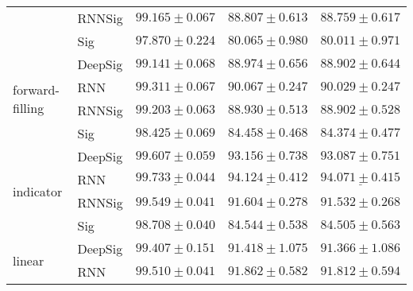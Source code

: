 \begin{tabular}{lllll}
                                 & RNNSig  &                           $ 99.165 \pm 0.067 $ &                           $ 88.807 \pm 0.613 $ &                           $ 88.759 \pm 0.617 $ \\
                                 & Sig     &                           $ 97.870 \pm 0.224 $ &                           $ 80.065 \pm 0.980 $ &                           $ 80.011 \pm 0.971 $ \\
\midrule
\multirow{4}{*}{forward-filling} & DeepSig &                           $ 99.141 \pm 0.068 $ &                           $ 88.974 \pm 0.656 $ &                           $ 88.902 \pm 0.644 $ \\
                                 & RNN     &                           $ 99.311 \pm 0.067 $ &                           $ 90.067 \pm 0.247 $ &                           $ 90.029 \pm 0.247 $ \\
                                 & RNNSig  &                           $ 99.203 \pm 0.063 $ &                           $ 88.930 \pm 0.513 $ &                           $ 88.902 \pm 0.528 $ \\
                                 & Sig     &                           $ 98.425 \pm 0.069 $ &                           $ 84.458 \pm 0.468 $ &                           $ 84.374 \pm 0.477 $ \\
\midrule
\multirow{4}{*}{indicator}       & DeepSig &               $  \mathbf{ 99.607 \pm 0.059 } $ &               $  \mathbf{ 93.156 \pm 0.738 } $ &               $  \mathbf{ 93.087 \pm 0.751 } $ \\
                                 & RNN     &  $  \mathbf{ \underline{ 99.733 \pm 0.044 }} $ &  $  \mathbf{ \underline{ 94.124 \pm 0.412 }} $ &  $  \mathbf{ \underline{ 94.071 \pm 0.415 }} $ \\
                                 & RNNSig  &                           $ 99.549 \pm 0.041 $ &                           $ 91.604 \pm 0.278 $ &                           $ 91.532 \pm 0.268 $ \\
                                 & Sig     &                           $ 98.708 \pm 0.040 $ &                           $ 84.544 \pm 0.538 $ &                           $ 84.505 \pm 0.563 $ \\
\midrule
\multirow{4}{*}{linear}          & DeepSig &                           $ 99.407 \pm 0.151 $ &                           $ 91.418 \pm 1.075 $ &                           $ 91.366 \pm 1.086 $ \\
                                 & RNN     &                           $ 99.510 \pm 0.041 $ &                           $ 91.862 \pm 0.582 $ &                           $ 91.812 \pm 0.594 $ \\

\end{tabular}
